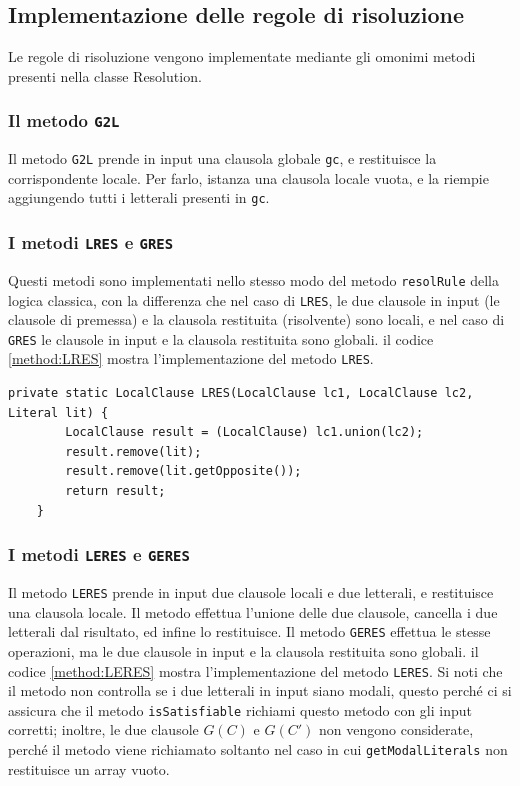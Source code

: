 \documentclass[a4paper,12pt]{report}
\begin{document}
\subsection*{Implementazione delle regole di risoluzione}
Le regole di risoluzione vengono implementate mediante gli omonimi metodi presenti nella classe Resolution.

\subsubsection{Il metodo \texttt{G2L}}
Il metodo \texttt{G2L} prende in input una clausola globale \texttt{gc}, e restituisce la corrispondente locale. Per farlo, istanza una clausola locale vuota, e la riempie aggiungendo tutti i letterali presenti in \texttt{gc}.

\subsubsection{I metodi \texttt{LRES} e \texttt{GRES}}
Questi metodi sono implementati nello stesso modo del metodo \texttt{resolRule} della logica classica, con la differenza che nel caso di \texttt{LRES}, le due clausole in input (le clausole di premessa) e la clausola restituita (risolvente) sono locali, e nel caso di \texttt{GRES} le clausole in input e la clausola restituita sono globali. il codice \ref{method:LRES} mostra l'implementazione del metodo \texttt{LRES}.

\begin{minipage}{\linewidth}
    \small
    \begin{lstlisting}[caption={Metodo \texttt{LRES} della classe \texttt{Resolution}}, label={method:LRES}]
    private static LocalClause LRES(LocalClause lc1, LocalClause lc2, Literal lit) {
        LocalClause result = (LocalClause) lc1.union(lc2);
        result.remove(lit);
        result.remove(lit.getOpposite());
        return result;
    }
    \end{lstlisting}
\end{minipage}

\subsubsection{I metodi \texttt{LERES} e \texttt{GERES}}
Il metodo \texttt{LERES} prende in input due clausole locali e due letterali, e restituisce una clausola locale. Il metodo effettua l'unione delle due clausole, cancella i due letterali dal risultato, ed infine lo restituisce. Il metodo \texttt{GERES} effettua le stesse operazioni, ma le due clausole in input e la clausola restituita sono globali. il codice \ref{method:LERES} mostra l'implementazione del metodo \texttt{LERES}. Si noti che il metodo non controlla se i due letterali in input siano modali, questo perché ci si assicura che il metodo \texttt{isSatisfiable} richiami questo metodo con gli input corretti; inoltre, le due clausole $G(C)$ e $G(C')$ non vengono considerate, perché il metodo viene richiamato soltanto nel caso in cui \texttt{getModalLiterals} non restituisce un array vuoto.
\end{document}
